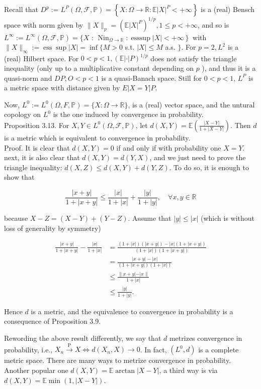 \documentclass[11pt]{amsbook}
\theoremstyle{plain}%
\theoremstyle{definition}
\theoremstyle{remark}
\begin{document}
Recall that $D^{p}:=L^{P}(\Omega, \mathcal{F}, \mathbb{P})=\left\{X: \Omega \rightarrow \mathbb{R}: \mathbb{E}|X|^{P}<+\infty\right\}$ is a (real) Bensch space with norm given by $\|X\|_{p}=\left(\mathbb{E}|X|^{P}\right)^{1 / p}, 1 \leq p<+\infty$, and so is $L^{\infty}:=L^{\infty}(\Omega, \mathcal{F}, \mathbb{P})=\{X$ : $\left.\operatorname{Nin}_{\Omega \rightarrow \mathbb{R}}: \operatorname{esssup}|X|<+\infty\right\}$ with $\|X\|_{\infty}:=\operatorname{ess} \sup |X|=\inf \{M>0$ s.t. $|X| \leq M$ a.s. $\}$. For $p=2, L^{2}$ is a (real) Hilbert space. For $0<p<1,(\mathbb{E}|\cdot| P)^{1 / p}$ does not satisfy the triangle inequality (only up to a multiplicative constant depending on $p$ ), and thus it is a quasi-norm and $D P, O<p<1$ is a quasi-Banach space. Still for $0<p<1$, $L^{P}$ is a metric space with distance given by $E|X=Y| P$.

Now, $L^{0}:=L^{0}(\Omega, F, \mathbb{P})=\{X: \Omega \rightarrow \mathbb{R}\}$, is a (real) vector space, and the untural copology on $L^{0}$ is the one induced by convergence in probability.\\
Proposition 3.13. For $X, Y \in L^{0}(\Omega, \mathcal{F}, \mathbb{P})$, let $d(X, Y)=\mathbb{E}\left(\frac{|X-Y|}{1+|X-Y|}\right)$. Then $d$ is a metric which is equivalent to convergence in probability.\\
Proof. It is clear that $d(X, Y)=0$ if and only if with probability one $X=Y$. next, it is also clear that $d(X, Y)=d(Y, X)$, and we just need to prove the triangle inequality: $d(X, Z) \leq d(X, Y)+d(Y, Z)$. To do so, it is enough to show that

$$
\frac{|x+y|}{1+|x+y|} \leq \frac{|x|}{1+|x|}+\frac{|y|}{1+|y|}, \quad \forall x, y \in \mathbb{R}
$$

because $X-Z=(X-Y)+(Y-Z)$. Assume that $|y| \leq|x|$ (which is without loss of generality by symmetry)

$$
\begin{aligned}
\frac{|x+y|}{1+|x+y|}-\frac{|x|}{1+|x|} & =\frac{(1+|x|)(|x+y|)-|x|(1+|x+y|)}{(1+|x|)(1+|x+y|)} \\
& =\frac{|x+y|-|x|}{(1+|x+y|)(1+|x|)} \\
& \leq \frac{\|x+y|-| x\|}{1+|x|} \\
& \leq \frac{|y|}{1+|y|} .
\end{aligned}
$$

Hence $d$ is a metric, and the equivalence to convergence in probability is a consequence of Proposition 3.9.

Rewording the above result differently, we say that $d$ metrizes convergence in probability, i.e., $X_{n} \xrightarrow{\mathrm{P}} X \Leftrightarrow d\left(X_{n}, X\right) \rightarrow 0$. In fact, $\left(L^{0}, d\right)$ is a complete metric space. There are many ways to metrize convergence in probability. Another popular one $d(X, Y)=\mathbb{E} \arctan |X-Y|$, a third way is via $d(X, Y)=\mathbb{E} \min (1,|X-Y|)$.
\end{document}
